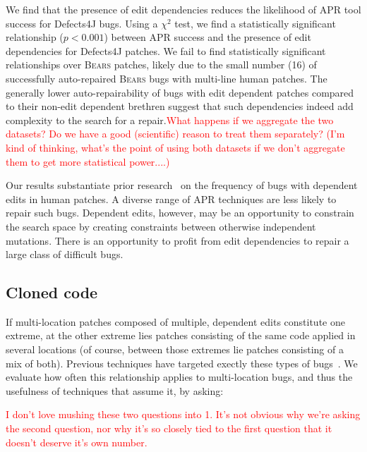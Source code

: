 \documentclass[10pt, conference]{IEEEtran}
\newcommand\todo[1]{\textcolor{red}{#1}}
\newcommand\bears{\textsc{Bears}\xspace}
\begin{document}
We find that the presence of edit dependencies 
reduces the likelihood of APR tool success for Defects4J bugs.
Using a $\chi^2$ test, we find a statistically significant relationship ($p < 0.001$)
between APR success and the presence of edit dependencies for Defects4J patches. 
We fail to find statistically 
significant relationships over \bears patches, likely due to the small number (16) of 
successfully auto-repaired \bears bugs with multi-line human patches.
The generally lower auto-repairability of bugs with edit dependent patches compared 
to their non-edit dependent brethren suggest that such dependencies indeed 
add complexity to the search for a repair.\todo{What happens if we aggregate the
  two datasets? Do we have a good (scientific) reason to treat them separately?
  (I'm kind of thinking, what's the point of using both datasets if we don't
  aggregate them to get more statistical power....)}

Our results substantiate prior research~\cite{zhong2015} on the frequency of 
bugs with dependent edits in human patches. A diverse range of APR 
techniques are less likely to repair such bugs. Dependent edits, however, may 
be an opportunity to constrain the search space by creating constraints between 
otherwise independent mutations. There is an opportunity to profit from edit 
dependencies to repair a large class of difficult bugs.


\subsection{Cloned code}

If multi-location patches composed of multiple, dependent edits constitute one
extreme, at the other extreme lies patches consisting of the same code applied
in several locations (of course, between those extremes lie patches consisting
of a mix of both). Previous techniques have targeted exectly these types of
bugs~\cite{wang2018,saha2019harnessing}.  We evaluate how often this relationship applies to
multi-location bugs, and thus the usefulness of techniques that assume it, by asking: 

\todo{I don't love mushing these two questions into 1.  It's not obvious why
  we're asking the second question, nor why it's so closely tied to the first
  question that it doesn't deserve it's own number.}
\end{document}
